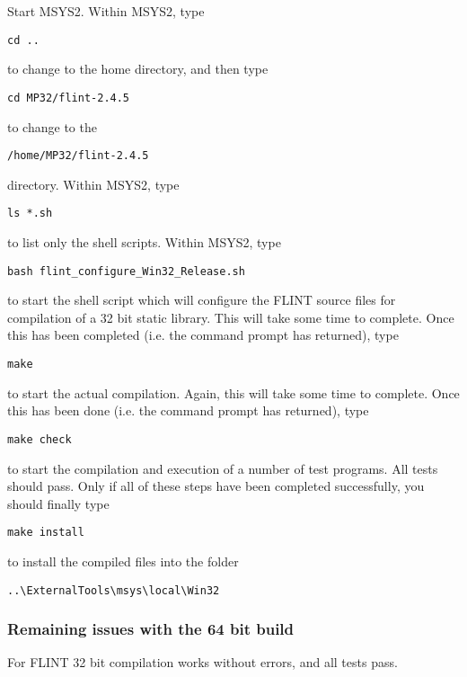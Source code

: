 \vpara
Start MSYS2. Within MSYS2, type
\begin{verbatim}
cd ..
\end{verbatim}
to change to the home directory, and then type 
\begin{verbatim}
cd MP32/flint-2.4.5
\end{verbatim}
to change to the
\begin{verbatim}
/home/MP32/flint-2.4.5
\end{verbatim}
directory. Within MSYS2, type
\begin{verbatim}
ls *.sh
\end{verbatim}
to list only the shell scripts. Within MSYS2, type
\begin{verbatim}
bash flint_configure_Win32_Release.sh
\end{verbatim}
to start the shell script which will configure the FLINT source files for compilation of a 32 bit static library. This will take some time to complete. Once this has been completed (i.e. the command prompt has returned), type
\begin{verbatim}
make
\end{verbatim}
to start the actual compilation. Again, this will take some time to complete. Once this has been done (i.e. the command prompt has returned), type
\begin{verbatim}
make check
\end{verbatim}
to start the compilation and execution of a number of test programs. All tests should pass. Only if all of these steps have been completed successfully, you should finally type
\begin{verbatim}
make install
\end{verbatim}
to install the compiled files into the folder
\begin{verbatim}
..\ExternalTools\msys\local\Win32
\end{verbatim}



\subsubsection{Remaining issues with the 64 bit build}


For FLINT 32 bit compilation works without errors, and all tests pass.

